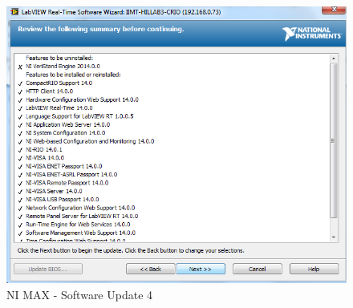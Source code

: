 \documentclass[a4paper,twoside,english]{report}
\begin{document}
\begin{figure}[!h]
\centering \includegraphics[scale=0.45]{Screenshots/Screenshot_2015-01-16_14-15-22.png}
\caption{NI MAX - Software Update 4}

\label{fig: NI MAX - Software Update 4} 
\end{figure}

\FloatBarrier
\end{document}
